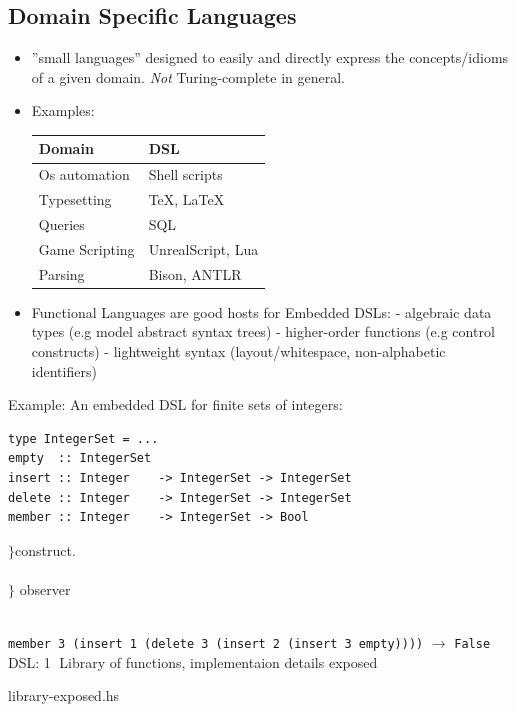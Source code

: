 \documentclass{article}
\newcommand{\Haskell}[1]{\texttt{#1}}
\begin{document}
\subsection{Domain Specific Languages}
\begin{itemize}
\item ''small languages'' designed to easily and directly express the concepts/idioms of a given domain. \emph{Not} Turing-complete in general. 
\item Examples:\qquad
\begin{tabular}{l|l}
	Domain         & DSL               \\ \hline
	Os automation  & Shell scripts     \\
	Typesetting    & \TeX, \LaTeX      \\
	Queries        & SQL               \\
	Game Scripting & UnrealScript, Lua \\
	Parsing        & Bison, ANTLR
\end{tabular}
\item Functional Languages are good hosts for Embedded DSLs:
\subitem- algebraic data types (e.g model abstract syntax trees)
\subitem- higher-order functions (e.g control constructs)
\subitem- lightweight syntax (layout/whitespace, non-alphabetic identifiers)
\end{itemize}
Example: An embedded DSL for finite sets of integers:\\
\begin{minipage}{.85\textwidth}
\begin{verbatim}
type IntegerSet = ...
empty  :: IntegerSet
insert :: Integer    -> IntegerSet -> IntegerSet
delete :: Integer    -> IntegerSet -> IntegerSet
member :: Integer    -> IntegerSet -> Bool
\end{verbatim}
\end{minipage}%
\begin{minipage}{.15\textwidth}
$\Biggl\} $construct.\\ \ \\
$\}$ observer
\end{minipage}\\
\Haskell{member 3 (insert 1 (delete 3 (insert 2 (insert 3 empty))))} $\rightarrow$ \Haskell{False}\\
DSL: \textcircled{1} Library of functions, implementaion details exposed
\begin{listing}[h!]
\caption{library-exposed.hs}
\inputminted{Haskell}{library-exposed.hs}
\end{listing}
\end{document}
